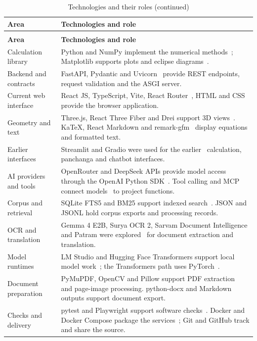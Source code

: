 \documentclass[12pt,a4paper,oneside]{report}
\begin{document}
\begin{longtable}[]{@{}
  >{\raggedright\arraybackslash}p{}
  >{\raggedright\arraybackslash}p{}@{}}
\caption{Technologies and their roles}\label{tab:technologies}\\
\toprule\noalign{}
\textbf{Area} & \textbf{Technologies and role} \\
\midrule\noalign{}
\endfirsthead
\caption[]{Technologies and their roles (continued)}\\
\toprule\noalign{}
\textbf{Area} & \textbf{Technologies and role} \\
\midrule\noalign{}
\endhead
\bottomrule\noalign{}
\endlastfoot
Calculation library & Python and NumPy implement the numerical methods~\cite{python,harris2020}; Matplotlib supports plots and eclipse diagrams~\cite{hunter2007}. \\
Backend and contracts & FastAPI, Pydantic and Uvicorn~\cite{fastapi,pydantic,uvicorn} provide REST endpoints, request validation and the ASGI server. \\
Current web interface & React JS, TypeScript, Vite, React Router~\cite{react,typescript,vite}, HTML and CSS provide the browser application. \\
Geometry and text & Three.js, React Three Fiber and Drei support 3D views~\cite{threejs,r3f}. KaTeX, React Markdown and remark-gfm~\cite{katex} display equations and formatted text. \\
Earlier interfaces & Streamlit and Gradio were used for the earlier~\cite{streamlit,gradio} calculation, panchanga and chatbot interfaces. \\
AI providers and tools & OpenRouter and DeepSeek APIs provide model access through the OpenAI Python SDK~\cite{openrouter,deepseek,openaisdk}. Tool calling and MCP connect models~\cite{mcp} to project functions. \\
Corpus and retrieval & SQLite FTS5 and BM25 support indexed search~\cite{sqlitefts5,robertson2009}. JSON and JSONL hold corpus exports and processing records. \\
OCR and translation & Gemma 4 E2B, Surya OCR 2, Sarvam Document Intelligence and Patram were explored~\cite{gemma,suryaocr,sarvam,patram} for document extraction and translation. \\
Model runtimes & LM Studio and Hugging Face Transformers support local model work~\cite{lmstudio,wolf2020transformers}; the Transformers path uses PyTorch~\cite{paszke2019pytorch}. \\
Document preparation & PyMuPDF, OpenCV and Pillow support PDF extraction~\cite{pymupdf,bradski2000opencv,pillow} and page-image processing. python-docx and Markdown outputs support document export. \\
Checks and delivery & pytest and Playwright support software checks~\cite{pytest,playwright}. Docker and Docker Compose package the services~\cite{merkel2014docker}; Git and GitHub track and share the source. \\
\end{longtable}
\end{document}
